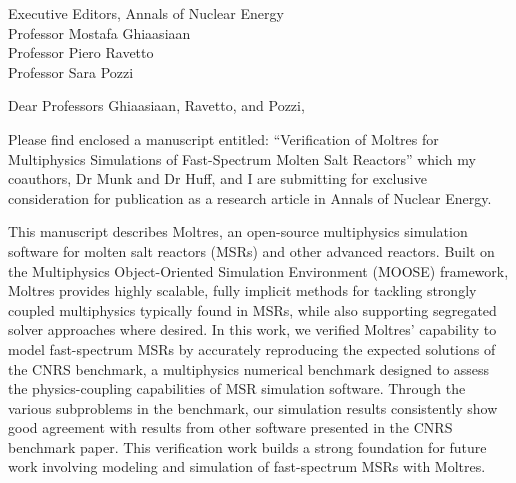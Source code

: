 \documentclass[11pt]{letter} %
\begin{document}


\begin{letter}{Executive Editors,
Annals of Nuclear Energy\\
Professor Mostafa Ghiaasiaan\\
Professor Piero Ravetto\\
Professor Sara Pozzi}


\address{Sun Myung Park\\
University of Illinois\\
226 Talbot Laboratory\\
MC-234\\
104 S. Wright Street\\
Urbana, IL 61801}




\opening{Dear Professors Ghiaasiaan, Ravetto, and Pozzi,}

Please find enclosed a manuscript entitled: ``Verification of Moltres for
Multiphysics Simulations of Fast-Spectrum Molten Salt Reactors'' which my
coauthors, Dr Munk and Dr Huff, and I are submitting for exclusive
consideration for publication as a research article in Annals of Nuclear
Energy.

This manuscript describes Moltres, an open-source multiphysics simulation
software for molten salt reactors (MSRs) and other advanced reactors.
Built on the Multiphysics Object-Oriented Simulation Environment (MOOSE)
framework, Moltres provides highly scalable, fully implicit methods
for tackling strongly coupled multiphysics typically found in MSRs, while also
supporting segregated solver approaches where desired. In this work,
we verified Moltres' capability to model fast-spectrum MSRs by
accurately reproducing the expected solutions of the CNRS benchmark, a
multiphysics numerical benchmark designed to assess the physics-coupling
capabilities of MSR simulation software. Through the various subproblems in the
benchmark, our simulation results consistently show good agreement with
results from other software presented in the CNRS benchmark paper. This
verification work builds a strong foundation for future work involving
modeling and simulation of fast-spectrum MSRs with Moltres.


\end{letter}
\end{document}
